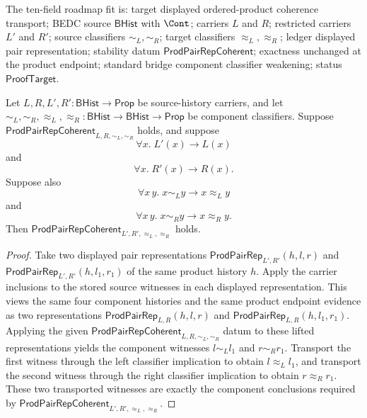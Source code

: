 \begin{theorem}
\label{thm:prod-pair-rep-coherence-under-classifier-weakening}
The ten-field roadmap fit is: target displayed ordered-product coherence
transport; BEDC source $\mathsf{BHist}$ with $\Cont$; carriers $L$ and $R$;
restricted carriers $L'$ and $R'$; source classifiers $\sim_L,\sim_R$; target
classifiers $\approx_L,\approx_R$; ledger displayed pair representation;
stability datum $\mathsf{ProdPairRepCoherent}$; exactness unchanged at the
product endpoint; standard bridge component classifier weakening; status
$\mathsf{ProofTarget}$.

Let $L,R,L',R':\mathsf{BHist}\to\mathsf{Prop}$ be source-history carriers, and
let
$\sim_L,\sim_R,\approx_L,\approx_R:\mathsf{BHist}\to\mathsf{BHist}\to\mathsf{Prop}$
be component classifiers. Suppose
$\mathsf{ProdPairRepCoherent}_{L,R,\sim_L,\sim_R}$ holds, and suppose
$$
\forall x.\;L'(x)\to L(x)
$$
and
$$
\forall x.\;R'(x)\to R(x).
$$
Suppose also
$$
\forall x\,y.\;x\sim_L y\to x\approx_L y
$$
and
$$
\forall x\,y.\;x\sim_R y\to x\approx_R y.
$$
Then $\mathsf{ProdPairRepCoherent}_{L',R',\approx_L,\approx_R}$ holds.
\end{theorem}
\begin{proof}
Take two displayed pair representations
$\mathsf{ProdPairRep}_{L',R'}(h,l,r)$ and
$\mathsf{ProdPairRep}_{L',R'}(h,l_1,r_1)$ of the same product history $h$.
Apply the carrier inclusions to the stored source witnesses in each displayed
representation. This views the same four component histories and the same
product endpoint evidence as two representations
$\mathsf{ProdPairRep}_{L,R}(h,l,r)$ and
$\mathsf{ProdPairRep}_{L,R}(h,l_1,r_1)$. Applying the given
$\mathsf{ProdPairRepCoherent}_{L,R,\sim_L,\sim_R}$ datum to these lifted
representations yields the component witnesses $l\sim_L l_1$ and
$r\sim_R r_1$. Transport the first witness through the left classifier
implication to obtain $l\approx_L l_1$, and transport the second witness
through the right classifier implication to obtain $r\approx_R r_1$. These two
transported witnesses are exactly the component conclusions required by
$\mathsf{ProdPairRepCoherent}_{L',R',\approx_L,\approx_R}$.
\end{proof}

